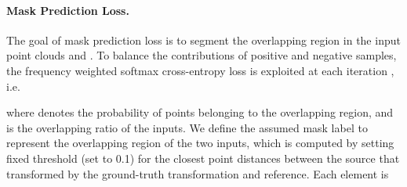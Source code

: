 \documentclass[10pt,twocolumn,letterpaper]{article}
\begin{document}
\vspace{-0.35cm}
\paragraph{Mask Prediction Loss.}
The goal of mask prediction loss is to segment the overlapping region in the input point clouds  and . To balance the contributions of positive and negative samples, the frequency weighted softmax cross-entropy loss is exploited at each iteration , i.e.

where  denotes the probability of points belonging to the overlapping region, and  is the overlapping ratio of the inputs. We define the assumed mask label  to represent the overlapping region of the two inputs, which is computed by setting fixed threshold (set to 0.1) for the closest point distances between the source that transformed by the ground-truth transformation and reference. Each element is
\end{document}
